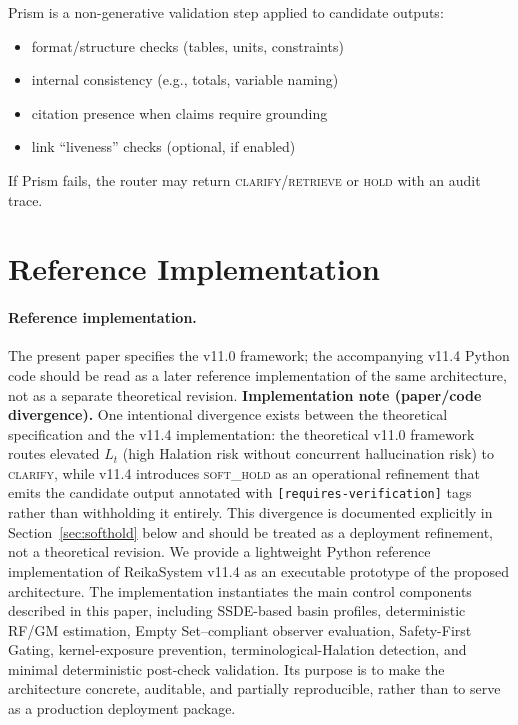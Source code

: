 \documentclass[11pt,a4paper]{article}
\begin{document}
Prism is a non-generative validation step applied to candidate outputs:
\begin{itemize}
\item format/structure checks (tables, units, constraints)
\item internal consistency (e.g., totals, variable naming)
\item citation presence when claims require grounding
\item link ``liveness'' checks (optional, if enabled)
\end{itemize}
If Prism fails, the router may return \textsc{clarify}/\textsc{retrieve} or
\textsc{hold} with an audit trace.

\section{Reference Implementation}
\label{sec:impl}

\paragraph{Reference implementation.}
The present paper specifies the v11.0 framework; the accompanying v11.4 Python
code should be read as a later reference implementation of the same architecture,
not as a separate theoretical revision.
\textbf{Implementation note (paper/code divergence).}
One intentional divergence exists between the theoretical specification and the
v11.4 implementation: the theoretical v11.0 framework routes elevated $L_t$
(high Halation risk without concurrent hallucination risk) to \textsc{clarify},
while v11.4 introduces \textsc{soft\_hold} as an operational refinement that
emits the candidate output annotated with \texttt{[requires-verification]} tags
rather than withholding it entirely.
This divergence is documented explicitly in Section~\ref{sec:softhold} below and
should be treated as a deployment refinement, not a theoretical revision.
We provide a lightweight Python reference implementation of ReikaSystem v11.4
as an executable prototype of the proposed architecture.
The implementation instantiates the main control components described in this
paper, including SSDE-based basin profiles, deterministic RF/GM estimation,
Empty Set--compliant observer evaluation, Safety-First Gating,
kernel-exposure prevention, terminological-Halation detection,
and minimal deterministic post-check validation.
Its purpose is to make the architecture concrete, auditable, and partially
reproducible, rather than to serve as a production deployment package.
\end{document}
